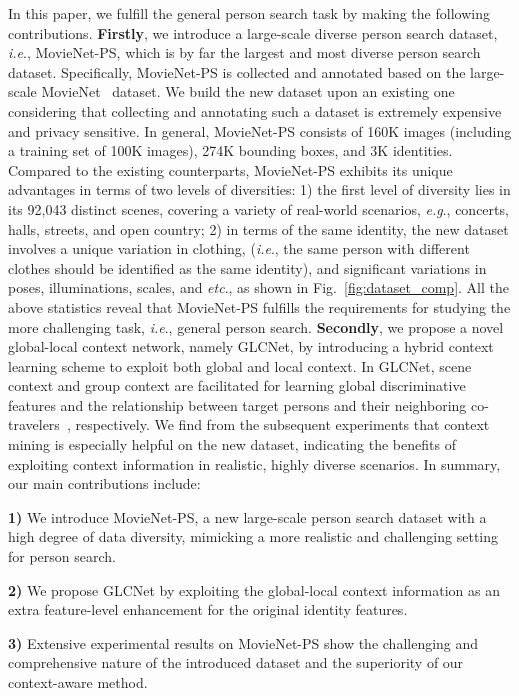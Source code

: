 \documentclass{article}
\def\eg{\emph{e.g}.} \def\Eg{\emph{E.g}.}
\def\ie{\emph{i.e}.} \def\Ie{\emph{I.e}.}
\def\etc{\emph{etc}.} \def\vs{\emph{vs}.}
\def\ourmodel{GLCNet}
\newcommand{\figref}[1]{Fig.~\ref{#1}}
\begin{document}
In this paper, we fulfill the general person search task by making the following contributions. \textbf{Firstly}, we introduce a large-scale diverse person search dataset, \ie, MovieNet-PS, which is by far the largest and most diverse person search dataset. Specifically, MovieNet-PS is collected and annotated based on the large-scale MovieNet~\cite{MovieNet} dataset. We build the new dataset upon an existing one considering that collecting and annotating such a dataset is extremely expensive and privacy sensitive. In general, MovieNet-PS consists of 160K images (including a training set of 100K images), 274K bounding boxes, and 3K identities. Compared to the existing 
counterparts, MovieNet-PS exhibits its unique advantages in terms of two levels of diversities: 1) the first level of diversity lies in its 92,043 distinct scenes, covering a variety of real-world scenarios, \eg, concerts, halls, streets, and open country; 2) in terms of the same identity, the new dataset involves a unique variation in clothing, (\ie, the same person with different clothes should be identified as the same identity), and significant variations in poses, illuminations, scales, and \etc{}, as shown in \figref{fig:dataset_comp}.
All the above statistics reveal that MovieNet-PS fulfills the requirements for studying the more challenging task, \ie, general person search. \textbf{Secondly}, we propose a novel global-local context network, namely \ourmodel{}, by introducing a hybrid context learning scheme to exploit both global and local context. In \ourmodel{}, scene context and group context are facilitated for learning global discriminative features and the relationship between target persons and their neighboring co-travelers~\cite{co_traveler}, respectively. We find from the subsequent experiments that context mining is especially helpful on the new dataset, indicating the benefits of exploiting context information in realistic, highly diverse scenarios. In summary, our main contributions include:






\textbf{1)} We introduce MovieNet-PS, a new large-scale person search dataset with a high degree of data diversity, mimicking a more realistic and challenging setting for person search.

\textbf{2)} We propose \ourmodel{} by exploiting the global-local context information as an extra feature-level enhancement for the original identity features.

\textbf{3)} Extensive experimental results on MovieNet-PS show the challenging and comprehensive nature of the introduced dataset and the superiority of our context-aware method.
\end{document}

